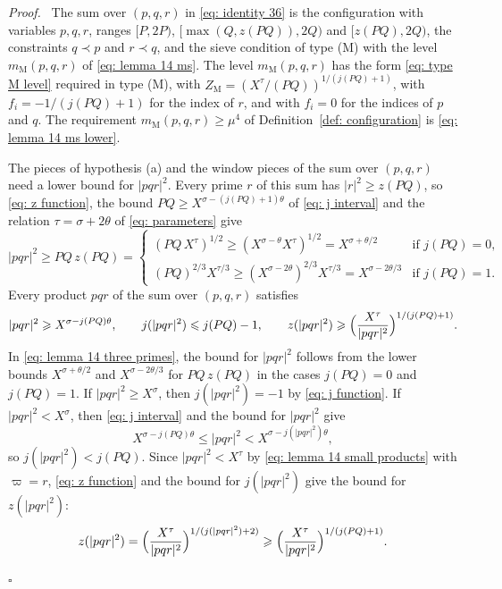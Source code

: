 \documentclass{article}
\numberwithin{equation}{section}
\newenvironment{proof}[1][Proof]{\par\medskip\noindent\textit{#1.}\ }{\hfill$\square$\par\medskip}
\newcommand{\Le}{\leqslant}
\newcommand{\Ge}{\geqslant}
\begin{document}
\begin{proof}
The sum over $(p, q, r)$ in \eqref{eq: identity 36} is the configuration with variables $p, q, r$, ranges $[P, 2P)$, $[\max(Q, z(PQ)), 2Q)$ and $[z(PQ), 2Q)$, the constraints $q \prec p$ and $r \prec q$, and the sieve condition of type (M) with the level $m_{\mathrm{M}}(p, q, r)$ of \eqref{eq: lemma 14 ms}. The level $m_{\mathrm{M}}(p, q, r)$ has the form \eqref{eq: type M level} required in type (M), with $Z_{\mathrm{M}} = (X^{\tau}/(PQ))^{1/(j(PQ)+1)}$, with $f_i = -1/(j(PQ)+1)$ for the index of $r$, and with $f_i = 0$ for the indices of $p$ and $q$. The requirement $m_{\mathrm{M}}(p, q, r) \Ge \mu^4$ of Definition~\ref{def: configuration} is \eqref{eq: lemma 14 ms lower}.

The pieces of hypothesis (a) and the window pieces of the sum over $(p, q, r)$ need a lower bound for $|pqr|^2$. Every prime $r$ of this sum has $|r|^2 \Ge z(PQ)$, so \eqref{eq: z function}, the bound $PQ \Ge X^{\sigma - (j(PQ)+1)\theta}$ of \eqref{eq: j interval} and the relation $\tau = \sigma + 2\theta$ of \eqref{eq: parameters} give
\begin{equation*}
|pqr|^2 \Ge PQ\, z(PQ) = \begin{cases} (PQ\, X^{\tau})^{1/2} \Ge (X^{\sigma - \theta} X^{\tau})^{1/2} = X^{\sigma + \theta/2} & \text{if } j(PQ) = 0, \\ (PQ)^{2/3} X^{\tau/3} \Ge (X^{\sigma - 2\theta})^{2/3} X^{\tau/3} = X^{\sigma - 2\theta/3} & \text{if } j(PQ) = 1. \end{cases}
\end{equation*}
Every product $pqr$ of the sum over $(p, q, r)$ satisfies
\begin{equation}
\label{eq: lemma 14 three primes}
|pqr|^2 \Ge X^{\sigma - j(PQ)\theta}, \qquad j(|pqr|^2) \Le j(PQ) - 1, \qquad z(|pqr|^2) \Ge \Bigl( \frac{X^{\tau}}{|pqr|^2} \Bigr)^{1/(j(PQ)+1)}.
\end{equation}
In \eqref{eq: lemma 14 three primes}, the bound for $|pqr|^2$ follows from the lower bounds $X^{\sigma + \theta/2}$ and $X^{\sigma - 2\theta/3}$ for $PQ\, z(PQ)$ in the cases $j(PQ) = 0$ and $j(PQ) = 1$. If $|pqr|^2 \Ge X^{\sigma}$, then $j(|pqr|^2) = -1$ by \eqref{eq: j function}. If $|pqr|^2 < X^{\sigma}$, then \eqref{eq: j interval} and the bound for $|pqr|^2$ give
\begin{equation*}
X^{\sigma - j(PQ)\theta} \Le |pqr|^2 < X^{\sigma - j(|pqr|^2)\theta},
\end{equation*}
so $j(|pqr|^2) < j(PQ)$. Since $|pqr|^2 < X^{\tau}$ by \eqref{eq: lemma 14 small products} with $\varpi = r$, \eqref{eq: z function} and the bound for $j(|pqr|^2)$ give the bound for $z(|pqr|^2)$:
\begin{equation*}
z(|pqr|^2) = \Bigl( \frac{X^{\tau}}{|pqr|^2} \Bigr)^{1/(j(|pqr|^2)+2)} \Ge \Bigl( \frac{X^{\tau}}{|pqr|^2} \Bigr)^{1/(j(PQ)+1)}.
\end{equation*}


\end{proof}
\end{document}
